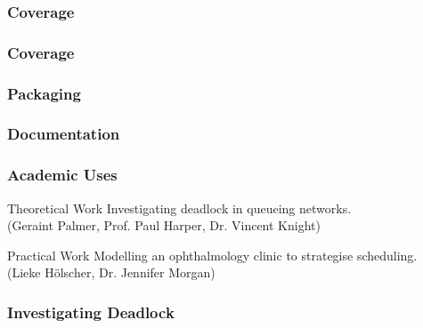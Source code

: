 \documentclass{beamer}
\begin{document}
\begin{frame}[fragile]
\frametitle{Coverage}
\resizebox{\textwidth}{!}{%
%
}
\end{frame}

\begin{frame}[fragile]
\frametitle{Coverage}
\resizebox{\textwidth}{!}{%
%
}
\end{frame}


\begin{frame}
\begin{figure}
    
\end{figure}
\end{frame}

\begin{frame}
\frametitle{Packaging}
\end{frame}

\begin{frame}
\begin{figure}
    
\end{figure}
\end{frame}

\begin{frame}
\frametitle{Documentation}
\end{frame}


\begin{frame}
\frametitle{Academic Uses}
\vfill
\begin{block}{Theoretical Work}
Investigating deadlock in queueing networks.\\
(Geraint Palmer, Prof. Paul Harper, Dr. Vincent Knight)
\end{block}
\vfill
\begin{block}{Practical Work}
Modelling an ophthalmology clinic to strategise scheduling.\\
(Lieke H\"{o}lscher, Dr. Jennifer Morgan)
\end{block}
\vfill
\end{frame}


\begin{frame}
\frametitle{Investigating Deadlock}
\begin{figure}
    
\end{figure}
\end{frame}
\end{document}
